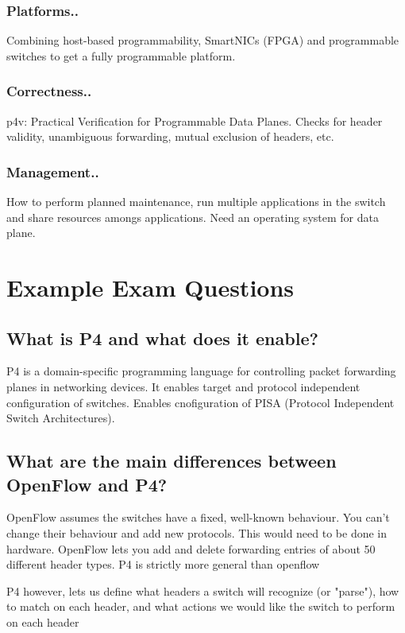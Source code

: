 \documentclass[a4paper, fontsize=8pt, landscape, DIV=1]{scrartcl}
\begin{document}
\begin{multicols*}{4}
  \subsubsection{Platforms..}
  Combining host-based programmability, SmartNICs (FPGA) and programmable switches
  to get a fully programmable platform.

  \subsubsection{Correctness..}
  p4v: Practical Verification for Programmable Data Planes. Checks for header validity, 
  unambiguous forwarding, mutual exclusion of headers, etc.

  \subsubsection{Management..}
  How to perform planned maintenance, run multiple applications in the switch and
  share resources amongs applications. Need an operating system for data plane. 


  \section{Example Exam Questions}
  \subsection{What is P4 and what does it enable?}
  P4 is a domain-specific programming language for controlling packet forwarding
  planes in networking devices. It enables target and protocol independent configuration
  of switches. Enables cnofiguration of PISA (Protocol Independent Switch Architectures).

  \subsection{What are the main differences between OpenFlow and P4?}
  OpenFlow assumes the switches have a fixed, well-known behaviour. You can't change
  their behaviour and add new protocols. This would need to be done in hardware. OpenFlow
  lets you add and delete forwarding entries of about 50 different header types.
  P4 is strictly more general than openflow

  P4 however, lets us define what headers a switch will recognize (or "parse"), 
  how to match on each header, and what actions we would like the switch to perform
  on each header


\end{multicols*}
\end{document}
